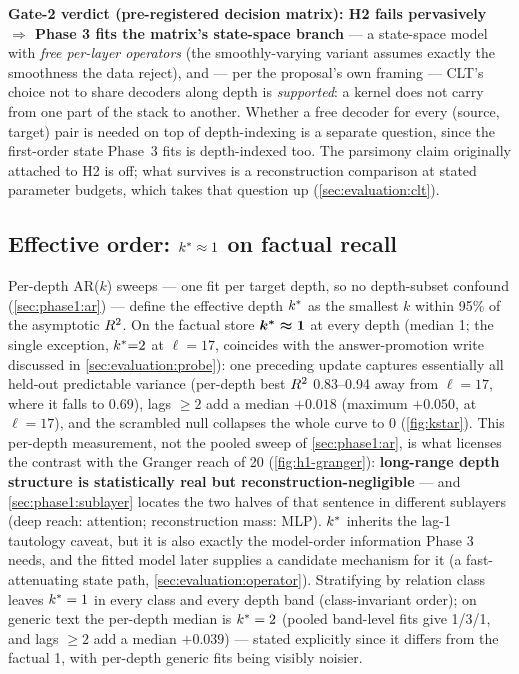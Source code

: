 \textbf{Gate-2 verdict (pre-registered decision matrix): H2 fails
pervasively $\Rightarrow$ Phase 3 fits the matrix's state-space branch} --- a
state-space model with
\emph{free per-layer operators} (the smoothly-varying variant assumes exactly
the smoothness the data reject), and --- per the proposal's own framing ---
CLT's choice not to share decoders along depth is \emph{supported}: a kernel
does not carry from one part of the stack to another. Whether a free decoder
for every (source,\,target) pair is needed on top of depth-indexing is a
separate question, since the first-order state Phase~3 fits is depth-indexed
too. The parsimony claim originally attached to H2 is off; what
survives is a reconstruction comparison at stated parameter budgets, which
takes that question up (\cref{sec:evaluation:clt}).

\subsection{Effective order: \texorpdfstring{$k^{\ast} \approx 1$}{k* approx 1}
on factual recall}
\label{sec:phase2:kstar}

Per-depth AR($k$) sweeps --- one fit per target depth, so no depth-subset
confound (\cref{sec:phase1:ar}) --- define the effective depth $k^{\ast}$ as the
smallest $k$ within 95\% of the asymptotic $R^2$. On the factual store
$\boldsymbol{k^{\ast} \approx 1}$ at every depth (median 1; the single
exception, $k^{\ast}{=}2$ at $\ell{=}17$, coincides with the answer-promotion
write discussed in \cref{sec:evaluation:probe}): one preceding update captures
essentially all held-out predictable variance (per-depth best $R^2$
0.83--0.94 away from $\ell{=}17$, where it falls to 0.69), lags $\ge 2$ add a
median $+0.018$ (maximum $+0.050$, at $\ell{=}17$), and the scrambled null
collapses the whole curve to 0 (\cref{fig:kstar}). This per-depth measurement,
not the pooled sweep of \cref{sec:phase1:ar}, is what licenses the contrast
with the Granger reach of 20 (\cref{fig:h1-granger}):
\textbf{long-range depth structure is statistically real but
reconstruction-negligible} --- and \cref{sec:phase1:sublayer} locates the two
halves of that sentence in different sublayers (deep reach: attention;
reconstruction mass: MLP). $k^{\ast}$ inherits the lag-1 tautology caveat, but
it is also exactly the model-order information Phase 3 needs, and the fitted
model later supplies a candidate mechanism for it (a fast-attenuating state
path, \cref{sec:evaluation:operator}). Stratifying by relation class leaves
$k^{\ast}=1$ in every class and every depth band (class-invariant order); on
generic text the per-depth median is $k^{\ast}=2$ (pooled band-level fits give
1/3/1, and lags $\ge 2$ add a median $+0.039$) --- stated
explicitly since it differs from the factual 1, with per-depth generic fits
being visibly noisier.

